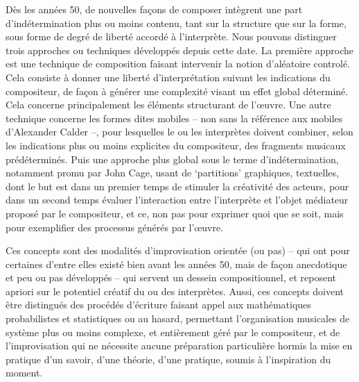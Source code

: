 \documentclass{article}
\begin{document}
Dès les années 50, de nouvelles façons de composer intègrent une part d'indétermination plus ou moins contenu, tant sur la structure que sur la forme, sous forme de degré de liberté accordé à l'interprète. Nous pouvons distinguer trois approches ou techniques développés depuis cette date. La première approche est une technique de composition faisant intervenir la notion d'aléatoire controlé. Cela consiste à donner une liberté d'interprétation suivant les indications du compositeur, de façon à générer une complexité visant un effet global déterminé. Cela concerne principalement les éléments structurant de l'œuvre. Une autre technique concerne les formes dites mobiles -- non sans la référence aux mobiles d'Alexander Calder --, pour lesquelles le ou les interprètes doivent combiner, selon les indications plus ou moins explicites du compositeur, des fragments musicaux prédéterminés. Puis une approche plus global sous le terme d'indétermination, notamment promu par John Cage, usant de `partitions' graphiques, textuelles, dont le but est dans un premier temps de stimuler la créativité des acteurs, pour dans un second temps évaluer l'interaction entre l'interprète et l'objet médiateur proposé par le compositeur, et ce, non pas pour exprimer quoi que se soit, mais pour exemplifier des processus générés par l'œuvre.

Ces concepts sont des modalités d'improvisation orientée (ou pas) -- qui ont pour certaines d'entre elles existé bien avant les années 50, mais de façon anecdotique et peu ou pas développés -- qui servent un dessein compositionnel, et reposent apriori sur le potentiel créatif du ou des interprètes.  Aussi, ces concepts doivent être distingués des procédés d'écriture faisant appel aux mathématiques probabilistes et statistiques ou au hasard, permettant l'organisation musicales de système plus ou moins complexe, et entièrement géré par le compositeur, et de l'improvisation qui ne nécessite aucune préparation particulière hormis la mise en pratique d'un savoir, d'une théorie, d'une pratique, soumis à l'inspiration du moment. %
\end{document}
